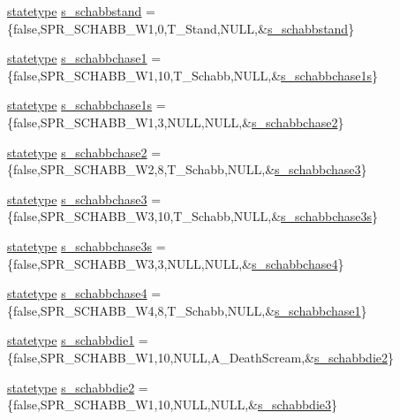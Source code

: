 \begin{DoxyCompactItemize}
\item 
\hyperlink{structstatestruct}{statetype} \hyperlink{WL__ACT2_8C_a96c8ad498d80bfcb7bb739872d571ac2}{s\_\-schabbstand} = \{false,SPR\_\-SCHABB\_\-W1,0,T\_\-Stand,NULL,\&\hyperlink{WL__ACT2_8C_a96c8ad498d80bfcb7bb739872d571ac2}{s\_\-schabbstand}\}
\item 
\hyperlink{structstatestruct}{statetype} \hyperlink{WL__ACT2_8C_aec6fd3f192ea893821d9f9707bcc714a}{s\_\-schabbchase1} = \{false,SPR\_\-SCHABB\_\-W1,10,T\_\-Schabb,NULL,\&\hyperlink{WL__ACT2_8C_ae61107bc3f8263290b22ccd4f2c38c66}{s\_\-schabbchase1s}\}
\item 
\hyperlink{structstatestruct}{statetype} \hyperlink{WL__ACT2_8C_ae61107bc3f8263290b22ccd4f2c38c66}{s\_\-schabbchase1s} = \{false,SPR\_\-SCHABB\_\-W1,3,NULL,NULL,\&\hyperlink{WL__ACT2_8C_af553c4ef1907ec503c521deaaea8e80d}{s\_\-schabbchase2}\}
\item 
\hyperlink{structstatestruct}{statetype} \hyperlink{WL__ACT2_8C_af553c4ef1907ec503c521deaaea8e80d}{s\_\-schabbchase2} = \{false,SPR\_\-SCHABB\_\-W2,8,T\_\-Schabb,NULL,\&\hyperlink{WL__ACT2_8C_ad4e74b25847638ebca63b49f2ae155b3}{s\_\-schabbchase3}\}
\item 
\hyperlink{structstatestruct}{statetype} \hyperlink{WL__ACT2_8C_ad4e74b25847638ebca63b49f2ae155b3}{s\_\-schabbchase3} = \{false,SPR\_\-SCHABB\_\-W3,10,T\_\-Schabb,NULL,\&\hyperlink{WL__ACT2_8C_aba7910cb33ab245b81e80bd07be2cc33}{s\_\-schabbchase3s}\}
\item 
\hyperlink{structstatestruct}{statetype} \hyperlink{WL__ACT2_8C_aba7910cb33ab245b81e80bd07be2cc33}{s\_\-schabbchase3s} = \{false,SPR\_\-SCHABB\_\-W3,3,NULL,NULL,\&\hyperlink{WL__ACT2_8C_ab0fd2868bb492ae069b33cb3fd3dc445}{s\_\-schabbchase4}\}
\item 
\hyperlink{structstatestruct}{statetype} \hyperlink{WL__ACT2_8C_ab0fd2868bb492ae069b33cb3fd3dc445}{s\_\-schabbchase4} = \{false,SPR\_\-SCHABB\_\-W4,8,T\_\-Schabb,NULL,\&\hyperlink{WL__DEF_8H_aec6fd3f192ea893821d9f9707bcc714a}{s\_\-schabbchase1}\}
\item 
\hyperlink{structstatestruct}{statetype} \hyperlink{WL__ACT2_8C_a893439687b453e85400bf0010c99a361}{s\_\-schabbdie1} = \{false,SPR\_\-SCHABB\_\-W1,10,NULL,A\_\-DeathScream,\&\hyperlink{WL__ACT2_8C_a6965c5d612fd363b8f47f13b17d2c0d0}{s\_\-schabbdie2}\}
\item 
\hyperlink{structstatestruct}{statetype} \hyperlink{WL__ACT2_8C_a6965c5d612fd363b8f47f13b17d2c0d0}{s\_\-schabbdie2} = \{false,SPR\_\-SCHABB\_\-W1,10,NULL,NULL,\&\hyperlink{WL__ACT2_8C_aff88f82fca52e5165b0754c76bca3d92}{s\_\-schabbdie3}\}

\end{DoxyCompactItemize}
